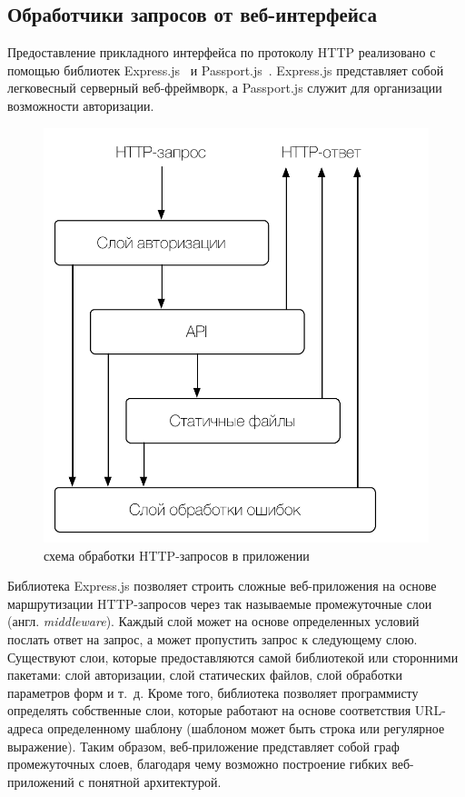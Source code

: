 \documentclass[a4paper,14pt,href,draft]{article}
\begin{document}
\subsection{Обработчики запросов от веб-интерфейса}
Предоставление прикладного интерфейса по протоколу HTTP реализовано с помощью библиотек Express.js~\cite{ExpressJS} и
Passport.js~\cite{PassportJS}. Express.js представляет собой легковесный серверный веб-фреймворк, а Passport.js служит
для организации возможности авторизации.

\begin{figure}[htbp]
\begin{center}
  \includegraphics[scale=0.8]{http-routing.pdf}
    \caption{схема обработки HTTP-запросов в приложении}
    \label{fig:HttpRouting}
\end{center}
\end{figure}

Библиотека Express.js позволяет строить сложные веб-приложения на основе маршрутизации HTTP-запросов через так называемые
промежуточные слои (англ. \textit{middleware}). Каждый слой может на основе определенных условий послать ответ на запрос,
а может пропустить запрос к следующему слою. Существуют слои, которые предоставляются самой библиотекой или
сторонними пакетами: слой авторизации, слой статических файлов, слой обработки параметров форм и т.~д. Кроме того,
библиотека позволяет программисту определять собственные слои, которые работают на основе соответствия URL-адреса определенному
шаблону (шаблоном может быть строка или регулярное выражение). Таким образом, веб-приложение представляет собой граф
промежуточных слоев, благодаря чему возможно построение гибких веб-приложений с понятной архитектурой.
\end{document}
